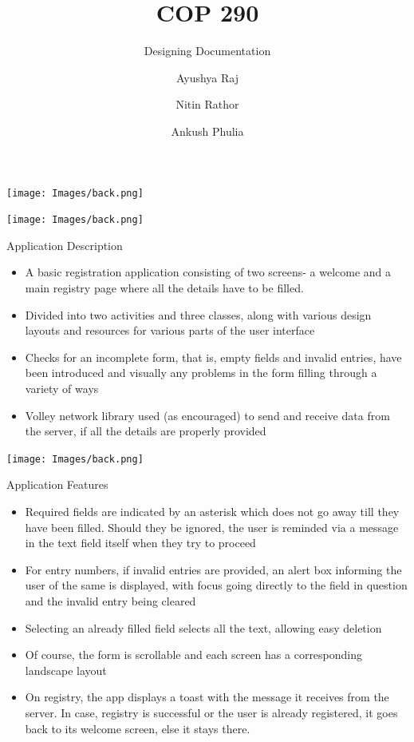 \documentclass{beamer}
\title{COP 290}
\subtitle{Designing Documentation}
\author{Ayushya Raj \and Nitin Rathor \and Ankush Phulia}
\institute[IIT Delhi] 
{
  Department of Computer Science\\
  IIT Delhi}
\begin{document}
{\usebackgroundtemplate%
{\texttt{[image: Images/back.png]}}
\begin{frame}
  \titlepage
\end{frame}
}
{\usebackgroundtemplate%
{\texttt{[image: Images/back.png]}}
\begin{frame}{Application Description}{}
  \begin{itemize}
  \item {
   A basic registration application consisting of two screens- a welcome and a main registry page where all the details have to be filled.
  }
  \item {
    Divided into two activities and three classes, along with various design layouts and resources for various parts of the user interface
  }
  \item {
    Checks for an incomplete form, that is, empty fields and invalid entries, have been introduced and visually any problems in the form filling through a variety of ways
  }
  \item{
  Volley network library used (as encouraged) to send and receive data from the server, if all the details are properly provided
  }
  \end{itemize}
\end{frame}
}
{\usebackgroundtemplate%
{\texttt{[image: Images/back.png]}}

\begin{frame}{Application Features}
  \begin{itemize}
  \item {
    Required fields are indicated by an asterisk which does not go away till they have been filled. Should they be ignored, the user is reminded via a message in the text field itself when they try to proceed
  }
  \item {   
    For entry numbers, if invalid entries are provided, an alert box informing the user of the same is displayed, with focus going directly to the field in question and the invalid entry being cleared
  }
  \item {
    Selecting an already filled field selects all the text, allowing easy deletion
  }
  \item {
    Of course, the form is scrollable and each screen has a corresponding landscape layout
  }
  \item {
    On registry, the app displays a toast with the message it receives from the server. In case, registry is successful or the user is already registered, it goes back to its welcome screen, else it stays there.
  }
  \end{itemize}
\end{frame}
}
\end{document}
